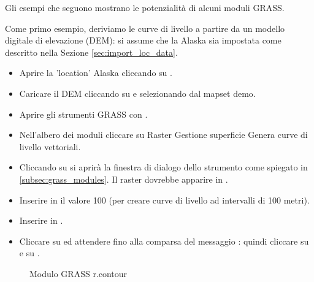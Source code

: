 Gli esempi che seguono mostrano le potenzialità di alcuni moduli GRASS. 


Come primo esempio, deriviamo le curve di livello a partire da un modello 
digitale di elevazione (DEM): si assume che la  Alaska 
sia impostata come descritto nella Sezione \ref{sec:import_loc_data}. 

\begin{itemize}[label=--]
\item Aprire la 'location' Alaska cliccando su .
\item Caricare il DEM  cliccando su 
 e selezionando  
dal mapset demo.
\item Aprire gli strumenti GRASS con . 
\item Nell'albero dei moduli cliccare su Raster \arrow Gestione superficie \arrow Genera curve di livello vettoriali. 
\item Cliccando su  si aprirà la finestra di dialogo dello strumento
come spiegato in \ref{subsec:grass_modules}. Il raster  dovrebbe 
apparire in . 
\item Inserire in  il valore 100 
(per creare curve di livello ad intervalli di 100 metri).
\item Inserire in 
. 
\item Cliccare su  ed attendere fino alla comparsa del messaggio 
: quindi cliccare su  
e su . 
\end{itemize}

\begin{figure}[ht]
\centering
    \hspace{0.5cm}
   \caption{\grass Modulo GRASS r.contour \nixcaption}\label{fig:grass_toolbox_rcontour}
\end{figure}

